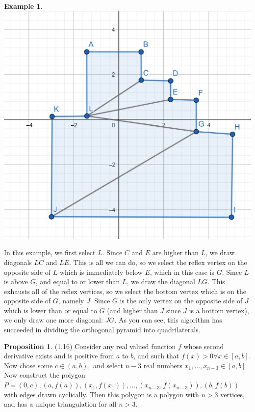 \documentclass[12pt]{article}
\theoremstyle{definition}
\newtheorem{proposition}{Proposition}
\newtheorem{example}{Example}
\begin{document}
\begin{example}


 


\includegraphics[scale=0.5]{orthogonal_pyramid_example.png}



In this example, we first select $L$. Since $C$ and $E$ are higher than $L$, we draw diagonals $ LC $ and $ LE $. This is all we can do, so we select the reflex vertex on the opposite side of $L$ which is immediately below $E$, which in this case is $G$. Since $L$ is above $G$, and equal to or lower than $L$, we draw the diagonal $LG$. This exhausts all of the reflex vertices, so we select the bottom vertex which is on the opposite side of $G$, namely $J$. Since $G$ is the only vertex on the opposite side of $J$ which is lower than or equal to $G$ (and higher than $J$ since $J$ is a bottom vertex), we only draw one more diagonal: $JG$. As you can see, this algorithm has succeeded in dividing the orthogonal pyramid into quadrilaterals. 
\end{example}

\begin{proposition}(1.16)
Consider any real valued function $f$ whose second derivative exists and is positive from $a$ to $b$, and such that $f(x) > 0 \forall x\in [a,b]$. Now chose some $c\in (a,b),$ and select $n-3$ real numbers $x_1, \dots, x_{n-3}\in [a,b]$. Now construct the polygon $ P = (0,c), (a, f(a)), (x_1, f(x_1)), \dots , (x_{n-3}, f(x_{n-3})), (b, f(b))$ with edges drawn cyclically. Then this polygon is a polygon with $n> 3$ vertices, and has a unique triangulation for all $n > 3$. 

\end{proposition}
\end{document}
